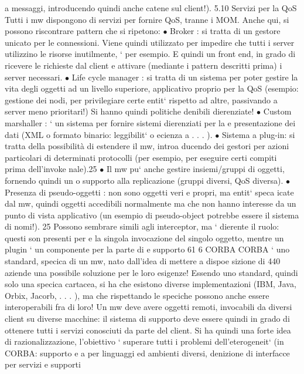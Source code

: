 \documentclass[a4paper,12pt]{article}
\begin{document}
a
messaggi, introducendo quindi anche catene sul client!).
5.10
Servizi per la QoS
Tutti i mw dispongono di servizi per fornire QoS, tranne i MOM. Anche qui, si
possono riscontrare pattern che si ripetono:
$\bullet$ Broker : si tratta di un gestore unicato per le connessioni. Viene quindi
utilizzato per impedire che tutti i server utilizzino le risorse inutilmente,
`
per esempio. E quindi un front end, in grado di ricevere le richieste dal
client e attivare (mediante i pattern descritti prima) i server necessari.
$\bullet$ Life cycle manager : si tratta di un sistema per poter gestire la vita degli
oggetti ad un livello superiore, applicativo proprio per la QoS (esempio:
gestione dei nodi, per privilegiare certe entit` rispetto ad altre, passivando
a
server meno prioritari!) Si hanno quindi politiche denibili dierenziate!
$\bullet$ Custom marshaller : ` un sistema per fornire sistemi dierenziati per la
e
presentazione dei dati (XML o formato binario: leggibilit` o ecienza
a
. . . ).
$\bullet$ Sistema a plug-in: si tratta della possibilità di estendere il mw, introa
ducendo dei gestori per azioni particolari di determinati protocolli (per
esempio, per eseguire certi compiti prima dell'invoke nale).25
$\bullet$ Il mw pu` anche gestire insiemi/gruppi di oggetti, fornendo quindi un
o
supporto alla replicazione (gruppi diversi, QoS diversa).
$\bullet$ Presenza di pseudo-oggetti : non sono oggetti veri e propri, ma entit` speca
icate dal mw, quindi oggetti accedibili normalmente ma che non hanno
interesse da un punto di vista applicativo (un esempio di pseudo-object
potrebbe essere il sistema di nomi!).
25 Possono sembrare simili agli interceptor, ma ` dierente il ruolo: questi son presenti per
e
la singola invocazione del singolo oggetto, mentre un plugin ` un componente per la parte di
e
supporto
61
6
CORBA
CORBA ` uno standard, specica di un mw, nato dall'idea di mettere a dispoe
sizione di 440 aziende una possibile soluzione per le loro esigenze!
Essendo uno standard, quindi solo una specica cartacea, si ha che esistono
diverse implementazioni (IBM, Java, Orbix, Jacorb, . . . ), ma che rispettando le
speciche possono anche essere interoperabili fra di loro!
Un mw deve avere oggetti remoti, invocabili da diversi client su diverse macchine: il sistema di supporto deve essere
quindi in grado di ottenere tutti i servizi
conosciuti da parte del client. Si ha quindi una forte idea di razionalizzazione,
l'obiettivo ` superare tutti i problemi dell'eterogeneit` (in CORBA: supporto
e
a
per linguaggi ed ambienti diversi, denizione di interfacce per servizi e supporti
\end{document}
